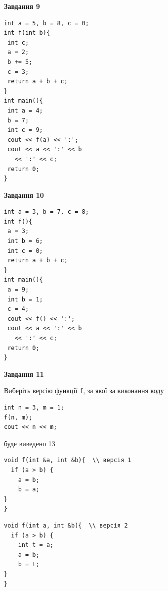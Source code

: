 \documentclass[12pt, ukrainian]{article}
\def\code#1{\Verb!#1!}
\begin{document}
{\begin {large}
\begin{minipage}[t]{11.0cm}
\end{minipage}


\begin{minipage}[t]{7.0cm}

\begin{center}
\textbf{Завдання 9}
\end{center}
\vspace{-8mm}

\begin{verbatim}
int a = 5, b = 8, c = 0;
int f(int b){
 int c;
 a = 2;
 b += 5;
 c = 3;
 return a + b + c;
}
int main(){
 int a = 4;
 b = 7;
 int c = 9;
 cout << f(a) << ':';
 cout << a << ':' << b 
   << ':' << c;
 return 0;
}
\end{verbatim}



\begin{center}
\textbf{Завдання 10}
\end{center}
\vspace{-8mm}

\begin{verbatim}
int a = 3, b = 7, c = 8;
int f(){
 a = 3;
 int b = 6;
 int c = 0;
 return a + b + c;
}
int main(){
 a = 9;
 int b = 1;
 c = 4;
 cout << f() << ':';
 cout << a << ':' << b 
   << ':' << c;
 return 0;
}
\end{verbatim}

\end{minipage}
\vline \hspace{1mm}
\begin{minipage}[t]{11.0cm}

\begin{center}
\textbf{Завдання 11}
\end{center}
Виберіть версію функції \code{f}, за якої за виконання коду
\begin{verbatim}
int n = 3, m = 1;
f(n, m);
cout << n << m;
\end{verbatim}

буде виведено 13

\begin{verbatim}
void f(int &a, int &b){  \\ версія 1
  if (a > b) {
    a = b;
    b = a;
}  
}
\end{verbatim}

\vspace{-8mm}\begin{verbatim}
void f(int a, int &b){  \\ версія 2
  if (a > b) {
    int t = a;
    a = b;
    b = t;
}  
}
\end{verbatim}


\end{minipage}
\end{large}}
\end{document}
